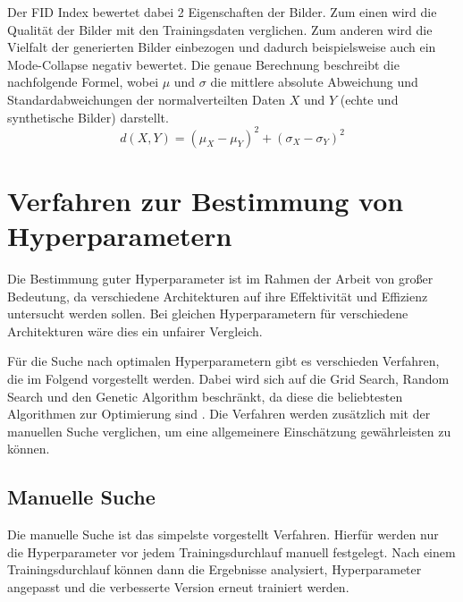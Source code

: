 Der \acrshort{FID} Index bewertet dabei 2 Eigenschaften der Bilder.
Zum einen wird die Qualität der Bilder mit den Trainingsdaten verglichen.
Zum anderen wird die Vielfalt der generierten Bilder einbezogen und dadurch beispielsweise auch ein Mode-Collapse negativ bewertet. 
Die genaue Berechnung beschreibt die nachfolgende Formel, wobei $\mu$ und $\sigma$ die mittlere absolute Abweichung und Standardabweichungen der normalverteilten Daten $X$ und $Y$ (echte und synthetische Bilder) darstellt.
\[d(X, Y) = (\mu_X - \mu_Y)^2 + (\sigma_X - \sigma_Y)^2 \]

\section{Verfahren zur Bestimmung von Hyperparametern}
\label{chapter:verfahren-bestimmung-hyperparameter}

Die Bestimmung guter Hyperparameter ist im Rahmen der Arbeit von großer Bedeutung, da verschiedene Architekturen auf ihre Effektivität und Effizienz untersucht werden sollen.
Bei gleichen Hyperparametern für verschiedene Architekturen wäre dies ein unfairer Vergleich.
\newline

Für die Suche nach optimalen Hyperparametern gibt es verschieden Verfahren, die im Folgend vorgestellt werden.
Dabei wird sich auf die Grid Search, Random Search und den Genetic Algorithm beschränkt, da diese die beliebtesten Algorithmen zur Optimierung sind \cite{hyperparameters-search-comparison-focus-genetic}.
Die Verfahren werden zusätzlich mit der manuellen Suche verglichen, um eine allgemeinere Einschätzung gewährleisten zu können.

\subsection{Manuelle Suche}
Die manuelle Suche ist das simpelste vorgestellt Verfahren.
Hierfür werden nur die Hyperparameter vor jedem Trainingsdurchlauf manuell festgelegt.
Nach einem Trainingsdurchlauf können dann die Ergebnisse analysiert, Hyperparameter angepasst und die verbesserte Version erneut trainiert werden.


